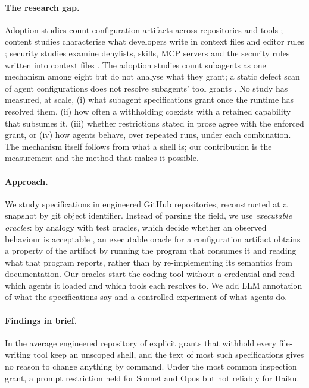 \paragraph{The research gap.}
Adoption studies count configuration artifacts across repositories and tools
\citep{Galster2026Harness,Galster2026Dataset,mohsenimofidi2026context,robbes2026agentic}; content studies characterise
what developers write in context files and editor rules \citep{Chatlatanagulchai2026AgentREADMEs,Jiang2026CursorRules};
security studies examine denylists, skills, MCP servers and the security rules written into context files
\citep{Chen2026Denylist,Liu2026SkillsInTheWild,Hasan2026MCP,Yan2026DoNotDeny}. The adoption studies count subagents
as one mechanism among eight but do not analyse what they grant; a static defect scan of
agent configurations does not resolve subagents' tool grants \citep{Kapner2026ScanningHarness}. No study
has measured, at scale, (i) what subagent specifications grant once the runtime has resolved them, (ii) how often a
withholding coexists with a retained capability that subsumes it, (iii) whether restrictions stated in prose agree
with the enforced grant, or (iv) how agents behave, over repeated runs, under each combination. The mechanism
itself follows from what a shell is; our contribution is the measurement and the method that makes it possible.

\paragraph{Approach.}
We study \nSpecsEng{} specifications in \nReposEng{} engineered GitHub repositories, reconstructed at a snapshot by git
object identifier. Instead of parsing the  field, we use \emph{executable oracles}: by analogy with test
oracles, which decide whether an observed behaviour is acceptable \citep[Def.~2.4]{barr2015oracle}, an executable
oracle for a configuration artifact obtains a property of the artifact by running the program that consumes it and
reading what that program reports, rather than by re-implementing its semantics from documentation. Our oracles start
the coding tool without a credential and read which agents it loaded and which tools each resolves to. We add LLM
annotation of what the specifications say and a controlled experiment of what agents do.

\paragraph{Findings in brief.}
In the average engineered repository \RQthreeIncoherentEng{} of explicit grants that withhold every file-writing tool
keep an unscoped shell, and the text of most such specifications gives no reason to change anything by command. Under
the most common inspection grant, a prompt restriction held for Sonnet and Opus but not reliably for Haiku.

